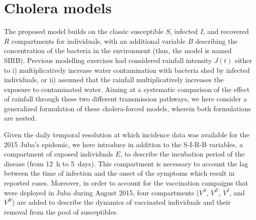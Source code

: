 
\section{Cholera models}
\label{sec:meth}
The proposed model builds on the classic susceptible $S$, infected $I$, and recovered $R$ compartments for individuals, with an additional variable $B$ describing the concentration of the bacteria in the environment (thus, the model is named SIRB). Previous modelling exercises had considered rainfall intensity $J(t)$ either to i) multiplicatively increase water contamination with bacteria shed by infected individuals\cite{Bertuzzo:ProbabilityExtinctionHaiti:2016,Pasetto:RealtimeProjectionsCholera:2017}, or ii) assumed that the rainfall multiplicatively increases the exposure to contaminated water\cite{Eisenberg:ExaminingRainfallCholera:2013}. Aiming at a systematic comparison of the effect of rainfall through these two different transmission pathways, we here consider a generalized formulation of these cholera-forced models, wherein both formulations are nested.

Given the daily temporal resolution at which incidence data was available for the 2015 Juba's epidemic, we here introduce in addition to the S-I-R-B variables, a compartment of exposed individuals $E$, to describe the incubation period of the disease (from 12~h to 5~days\cite{Azman:IncubationPeriodCholera:2013}). This compartment is necessary to account the lag between the time of infection and the onset of the symptoms which result in reported cases. Moreover, in order to account for the vaccination campaigns that were deployed in Juba during August 2015, four compartments ($V^S$, $V^E$, $V^I$, and $V^R$) are added to describe the dynamics of vaccinated individuals and their removal from the pool of susceptibles.

